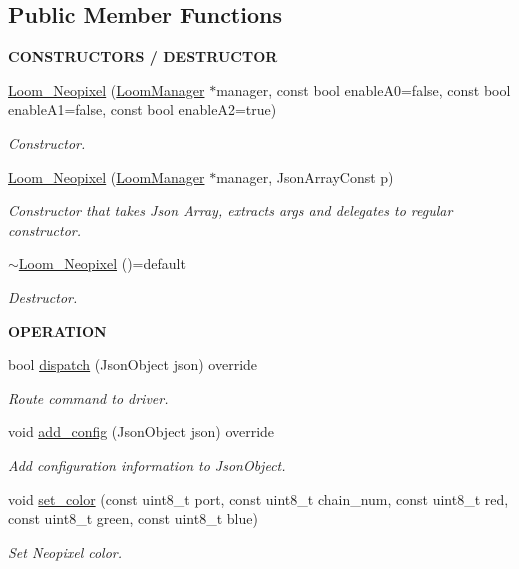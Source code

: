 \subsection*{Public Member Functions}
\begin{Indent}{\bf C\+O\+N\+S\+T\+R\+U\+C\+T\+O\+RS / D\+E\+S\+T\+R\+U\+C\+T\+OR}\par
\begin{DoxyCompactItemize}
\item 
\hyperlink{class_loom___neopixel_a2a0d74646338fb10a103a7ea73247e21}{Loom\+\_\+\+Neopixel} (\hyperlink{class_loom_manager}{Loom\+Manager} $\ast$manager, const bool enable\+A0=false, const bool enable\+A1=false, const bool enable\+A2=true)
\begin{DoxyCompactList}\small\item\em Constructor. \end{DoxyCompactList}\item 
\hyperlink{class_loom___neopixel_a3f640252abdf3a7bf3767f8ebd2d78eb}{Loom\+\_\+\+Neopixel} (\hyperlink{class_loom_manager}{Loom\+Manager} $\ast$manager, Json\+Array\+Const p)
\begin{DoxyCompactList}\small\item\em Constructor that takes Json Array, extracts args and delegates to regular constructor. \end{DoxyCompactList}\item 
\hyperlink{class_loom___neopixel_a478d9ab0f93182948e9969af40c65819}{$\sim$\+Loom\+\_\+\+Neopixel} ()=default
\begin{DoxyCompactList}\small\item\em Destructor. \end{DoxyCompactList}\end{DoxyCompactItemize}
\end{Indent}
\begin{Indent}{\bf O\+P\+E\+R\+A\+T\+I\+ON}\par
\begin{DoxyCompactItemize}
\item 
bool \hyperlink{class_loom___neopixel_a89ecb4894b7be0e00657d32aa2374a42}{dispatch} (Json\+Object json) override
\begin{DoxyCompactList}\small\item\em Route command to driver. \end{DoxyCompactList}\item 
void \hyperlink{class_loom___neopixel_a005ac12c181ff40647657c6c9b2fde2d}{add\+\_\+config} (Json\+Object json) override
\begin{DoxyCompactList}\small\item\em Add configuration information to Json\+Object. \end{DoxyCompactList}\item 
void \hyperlink{class_loom___neopixel_a5e5009a63413482de5b5baa54603da65}{set\+\_\+color} (const uint8\+\_\+t port, const uint8\+\_\+t chain\+\_\+num, const uint8\+\_\+t red, const uint8\+\_\+t green, const uint8\+\_\+t blue)
\begin{DoxyCompactList}\small\item\em Set Neopixel color. \end{DoxyCompactList}\end{DoxyCompactItemize}
\end{Indent}
